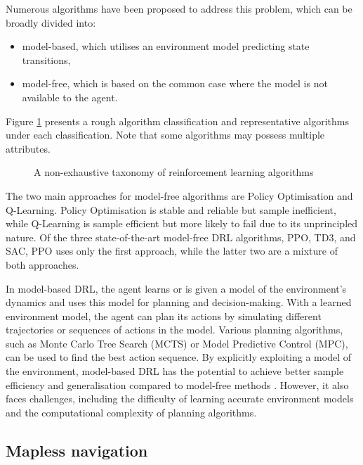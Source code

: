 Numerous algorithms have been proposed to address this problem, which can be broadly divided into:
\begin{itemize}
\item model-based, which utilises an environment model predicting state transitions,
\item model-free, which is based on the common case where the model is not available to the agent.
\end{itemize}
Figure \ref{fig:taxonomy-of-algorithms} presents a rough algorithm classification and representative algorithms under each classification. Note that some algorithms may possess multiple attributes.
\begin{figure}[htbp]
\centering

\caption{A non-exhaustive taxonomy of reinforcement learning algorithms \cite{ref:spinning-up}}
\label{fig:taxonomy-of-algorithms}
\end{figure}

The two main approaches for model-free algorithms are Policy Optimisation and Q-Learning. Policy Optimisation is stable and reliable but sample inefficient, while Q-Learning is sample efficient but more likely to fail due to its unprincipled nature. Of the three state-of-the-art model-free DRL algorithms, PPO, TD3, and SAC, PPO uses only the first approach, while the latter two are a mixture of both approaches.

In model-based DRL, the agent learns or is given a model of the environment's dynamics and uses this model for planning and decision-making. With a learned environment model, the agent can plan its actions by simulating different trajectories or sequences of actions in the model. Various planning algorithms, such as Monte Carlo Tree Search (MCTS) or Model Predictive Control (MPC), can be used to find the best action sequence. By explicitly exploiting a model of the environment, model-based DRL has the potential to achieve better sample efficiency and generalisation compared to model-free methods \cite{ref:model-based-survey}. However, it also faces challenges, including the difficulty of learning accurate environment models and the computational complexity of planning algorithms.



\subsection{Mapless navigation} \label{subsec:mapless-navi}

